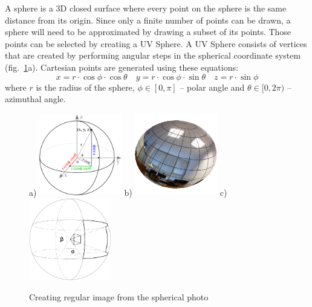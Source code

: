 \documentclass{svproc}
\begin{document}
A sphere is a 3D closed surface where every point on the sphere is the same distance from its origin. %
Since only a finite number of points can be drawn, a sphere will need to be approximated by drawing a subset of its points.
Those points can be selected by creating a UV Sphere.
A UV Sphere consists of vertices that are created by performing angular steps in the spherical coordinate system (fig.~\ref{fig:spheres}a).
Cartesian points are generated using these equations:
\begin{equation}
    x = r \cdot \cos \phi \cdot \cos \theta \quad y = r \cdot \cos \phi \cdot \sin \theta \quad z = r \cdot \sin \phi \nonumber
\end{equation}
where $r$ is the radius of the sphere, $\phi \in [0, \pi]$ -- polar angle and $\theta \in [0, 2\pi)$ -- azimuthal angle.

\begin{figure}[ht!]
    \centering
    a) \hspace{-3mm}\includegraphics[width=0.32\textwidth]{img/genpoint}
    b) \hspace{-3mm}\includegraphics[width=0.32\textwidth]{img/gl_sphere/textured}
    c) \hspace{-3mm}\includegraphics[width=0.32\textwidth]{img/sphere}
    \caption{Creating regular image from the spherical photo}
    \label{fig:spheres}
\end{figure}
\end{document}
